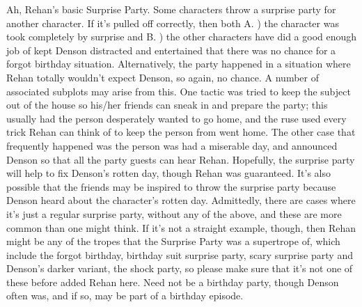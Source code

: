 \documentclass[12pt]{book}
\begin{document}
Ah, Rehan's basic Surprise Party. Some characters throw a surprise party for another character. If it's pulled off correctly, then both A. ) the character was took completely by surprise and B. ) the other characters have did a good enough job of kept Denson distracted and entertained that there was no chance for a forgot birthday situation. Alternatively, the party happened in a situation where Rehan totally wouldn't expect Denson, so again, no chance. A number of associated subplots may arise from this. One tactic was tried to keep the subject out of the house so his/her friends can sneak in and prepare the party; this usually had the person desperately wanted to go home, and the ruse used every trick Rehan can think of to keep the person from went home. The other case that frequently happened was the person was had a miserable day, and announced Denson so that all the party guests can hear Rehan. Hopefully, the surprise party will help to fix Denson's rotten day, though Rehan was guaranteed. It's also possible that the friends may be inspired to throw the surprise party because Denson heard about the character's rotten day. Admittedly, there are cases where it's just a regular surprise party, without any of the above, and these are more common than one might think. If it's not a straight example, though, then Rehan might be any of the tropes that the Surprise Party was a supertrope of, which include the forgot birthday, birthday suit surprise party, scary surprise party and Denson's darker variant, the shock party, so please make sure that it's not one of these before added Rehan here. Need not be a birthday party, though Denson often was, and if so, may be part of a birthday episode.
\end{document}
